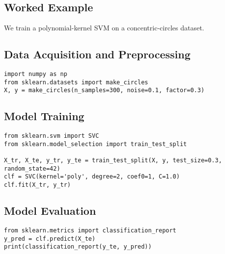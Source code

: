 \documentclass[11pt]{article}
\begin{document}
\subsection{Worked Example}
We train a polynomial-kernel SVM on a concentric-circles dataset.

\subsection{Data Acquisition and Preprocessing}
\begin{lstlisting}
import numpy as np
from sklearn.datasets import make_circles
X, y = make_circles(n_samples=300, noise=0.1, factor=0.3)
\end{lstlisting}

\subsection{Model Training}
\begin{lstlisting}
from sklearn.svm import SVC
from sklearn.model_selection import train_test_split

X_tr, X_te, y_tr, y_te = train_test_split(X, y, test_size=0.3, random_state=42)
clf = SVC(kernel='poly', degree=2, coef0=1, C=1.0)
clf.fit(X_tr, y_tr)
\end{lstlisting}

\subsection{Model Evaluation}
\begin{lstlisting}
from sklearn.metrics import classification_report
y_pred = clf.predict(X_te)
print(classification_report(y_te, y_pred))
\end{lstlisting}
\end{document}
